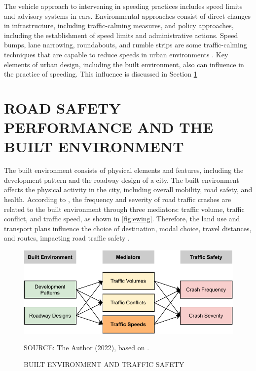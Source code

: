 The vehicle approach to intervening in speeding practices includes speed limits and advisory systems in cars. Environmental approaches consist of direct changes in infrastructure, including traffic-calming measures, and policy approaches, including the establishment of speed limits and administrative actions. Speed bumps, lane narrowing, roundabouts, and rumble strips are some traffic-calming techniques that are capable to reduce speeds in urban environments \cite{Welle2016}. Key elements of urban design, including the built environment, also can influence in the practice of speeding. This influence is discussed in Section \ref{be}

\section{ROAD SAFETY PERFORMANCE AND THE BUILT ENVIRONMENT} \label{be}





The built environment consists of physical elements and features, including the development pattern and the roadway design of a city. The built environment affects the physical activity in the city, including overall mobility, road safety, and health. According to \textcite{Ewing2009}, the frequency and severity of road traffic crashes are related to the built environment through three mediators: traffic volume, traffic conflict, and traffic speed, as shown in \autoref{fig:ewing}. Therefore, the land use and transport plans influence the choice of destination, modal choice, travel distances, and routes, impacting road traffic safety \cite{Tiwari}.  

\begin{figure}[!htbp]
    \centering\footnotesize
    \captionsetup{font=footnotesize}
    \caption{BUILT ENVIRONMENT AND TRAFFIC SAFETY}
    \includegraphics{fig/ewing.pdf}
    \label{fig:ewing}
    \par SOURCE: The Author (2022), based on \textcite{Ewing2009}.
\end{figure}

